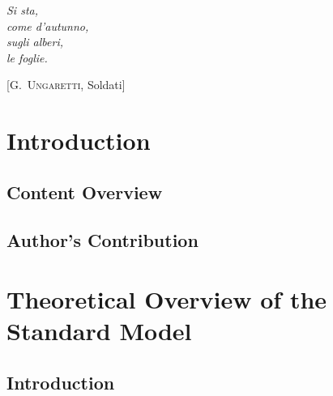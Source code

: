 \documentclass[10pt,twoside,cucitura,classica,english,openany]{toptesi}
\begin{document}

\english

\cleardoublepage

\frontespizio
\paginavuota
\begin{dedica}
\end{dedica}



\indici

\begin{citazioni}
  \textit{Si sta, \\
    come d'autunno, \\
    sugli alberi, \\
    le foglie.}

  [\textsc{G.~Ungaretti}, Soldati]
\end{citazioni}


\sommario



\mainmatter

\chapter{Introduction}
\label{cha:intro}



\section{Content Overview}
\label{sec:content-overview}



\section{Author's Contribution}
\label{sec:authors-contribution}



\chapter{Theoretical Overview of the Standard Model}
\label{cha:theoretical-overview}

\section{Introduction}
\label{sec:introduction}
\end{document}
